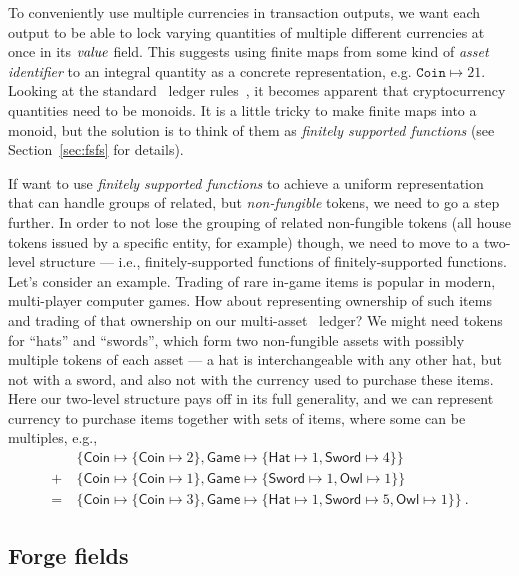To conveniently use multiple currencies in transaction outputs, we want each output to be able to lock varying quantities of multiple different currencies at once in its $\mathit{value}$ field.
This suggests using finite maps from some kind of \emph{asset identifier} to an integral quantity as a concrete representation, e.g. $\texttt{Coin} \mapsto 21$.
Looking at the standard \UTXO\ ledger rules~\cite{Zahnentferner18-UTxO}, it becomes apparent that cryptocurrency quantities need to be monoids.
It is a little tricky to make finite maps into a monoid, but the solution is to think of them as \emph{finitely supported functions} (see Section~\ref{sec:fsfs} for details).

If want to use \emph{finitely supported functions} to achieve a uniform
representation that can handle groups of related, but \emph{non-fungible} tokens, we need to go a step further.
In order to not lose the grouping of related non-fungible tokens (all house tokens issued by a specific entity, for example) though, we need to move to a two-level structure --- i.e., finitely-supported functions of finitely-supported functions. Let's consider an example. Trading of rare in-game items is popular in modern, multi-player computer games. How about representing ownership of such items and trading of that ownership on our multi-asset \UTXO\ ledger? We might need tokens for ``hats'' and ``swords'', which form two non-fungible assets with possibly multiple tokens of each asset --- a hat is interchangeable with any other hat, but not with a sword, and also not with the currency used to purchase these
items. Here our two-level structure pays off in its full generality, and we can represent currency to purchase items together with sets of items, where some can be multiples, e.g.,
%
\begin{align*}
  & \{\mathsf{Coin} \mapsto \{\mathsf{Coin} \mapsto 2\}, \mathsf{Game} \mapsto \{\mathsf{Hat} \mapsto 1, \mathsf{Sword} \mapsto 4\}\} \\
  + \ & \{\mathsf{Coin} \mapsto \{\mathsf{Coin} \mapsto 1\}, \mathsf{Game} \mapsto \{\mathsf{Sword} \mapsto 1, \mathsf{Owl} \mapsto 1\}\} \\
  = \ & \{\mathsf{Coin} \mapsto \{\mathsf{Coin} \mapsto 3\}, \mathsf{Game} \mapsto \{\mathsf{Hat} \mapsto 1, \mathsf{Sword} \mapsto 5, \mathsf{Owl} \mapsto 1\}\} \ .
\end{align*}

\subsection{Forge fields}

